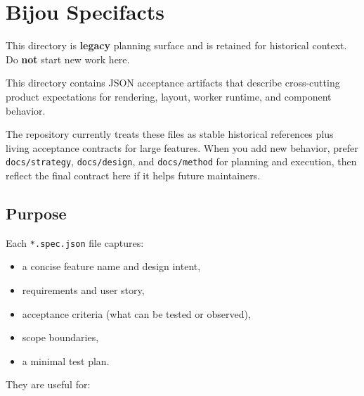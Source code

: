 \chapter{Bijou Specifacts}\label{record-012}

\smallskip

This directory is \textbf{legacy} planning surface and is retained for historical context. Do \textbf{not} start new work here.

This directory contains JSON acceptance artifacts that describe cross-cutting product expectations for rendering, layout, worker runtime, and component behavior.

The repository currently treats these files as stable historical references plus living acceptance contracts for large features. When you add new behavior, prefer \texttt{d\allowbreak{}o\allowbreak{}c\allowbreak{}s\allowbreak{}/\allowbreak{}s\allowbreak{}t\allowbreak{}r\allowbreak{}a\allowbreak{}t\allowbreak{}e\allowbreak{}g\allowbreak{}y}, \texttt{d\allowbreak{}o\allowbreak{}c\allowbreak{}s\allowbreak{}/\allowbreak{}d\allowbreak{}e\allowbreak{}s\allowbreak{}i\allowbreak{}g\allowbreak{}n}, and \texttt{d\allowbreak{}o\allowbreak{}c\allowbreak{}s\allowbreak{}/\allowbreak{}m\allowbreak{}e\allowbreak{}t\allowbreak{}h\allowbreak{}o\allowbreak{}d} for planning and execution, then reflect the final contract here if it helps future maintainers.

\section{Purpose}\label{record-012-purpose}

Each \texttt{*\allowbreak{}.\allowbreak{}s\allowbreak{}p\allowbreak{}e\allowbreak{}c\allowbreak{}.\allowbreak{}j\allowbreak{}s\allowbreak{}o\allowbreak{}n} file captures:

\begin{itemize}
\tightlist
\item
  a concise feature name and design intent,
\item
  requirements and user story,
\item
  acceptance criteria (what can be tested or observed),
\item
  scope boundaries,
\item
  a minimal test plan.
\end{itemize}

They are useful for:

